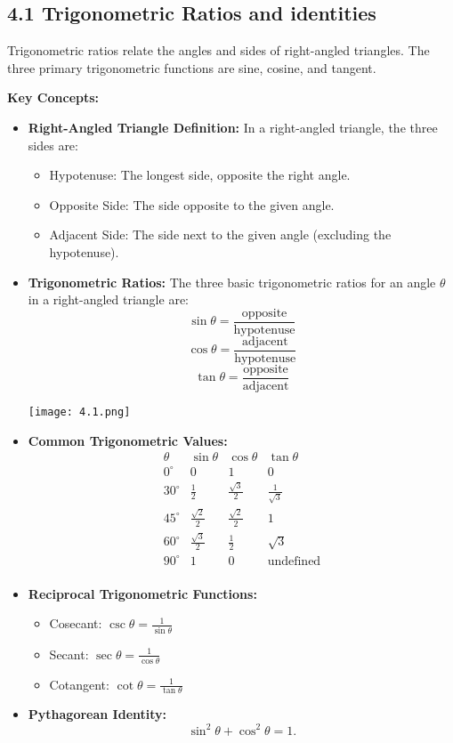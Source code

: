 
\subsection*{4.1 Trigonometric Ratios and identities}
Trigonometric ratios relate the angles and sides of right-angled triangles. The three primary trigonometric functions are sine, cosine, and tangent.

\textbf{Key Concepts:}

\begin{itemize}
	\item \textbf{Right-Angled Triangle Definition:}
	In a right-angled triangle, the three sides are:
	\begin{itemize}
		\item Hypotenuse: The longest side, opposite the right angle.
		\item Opposite Side: The side opposite to the given angle.
		\item Adjacent Side: The side next to the given angle (excluding the hypotenuse).
	\end{itemize}
	
	\item \textbf{Trigonometric Ratios:}
	The three basic trigonometric ratios for an angle $\theta$ in a right-angled triangle are:
	\[
	\sin \theta = \frac{\text{opposite}}{\text{hypotenuse}}
	\]
	\[
	\cos \theta = \frac{\text{adjacent}}{\text{hypotenuse}}
	\]
	\[
	\tan \theta = \frac{\text{opposite}}{\text{adjacent}}
	\]
	
	
	\begin{center}
		\texttt{[image: 4.1.png]}
	\end{center}
	
	\newpage
	\item \textbf{Common Trigonometric Values:}
	\[
	\begin{array}{c|c|c|c}
		\theta & \sin \theta & \cos \theta & \tan \theta \\
		\hline
		0^\circ & 0 & 1 & 0 \\
		30^\circ & \frac{1}{2} & \frac{\sqrt{3}}{2} & \frac{1}{\sqrt{3}} \\
		45^\circ & \frac{\sqrt{2}}{2} & \frac{\sqrt{2}}{2} & 1 \\
		60^\circ & \frac{\sqrt{3}}{2} & \frac{1}{2} & \sqrt{3} \\
		90^\circ & 1 & 0 & \text{undefined} \\
	\end{array}
	\]
	
	\item \textbf{Reciprocal Trigonometric Functions:}
	\begin{itemize}
		\item Cosecant: $\csc \theta = \frac{1}{\sin \theta}$
		\item Secant: $\sec \theta = \frac{1}{\cos \theta}$
		\item Cotangent: $\cot \theta = \frac{1}{\tan \theta}$
	\end{itemize}
	
	\item \textbf{Pythagorean Identity:}
	\[
	\sin^2 \theta + \cos^2 \theta = 1.
	\]
\end{itemize}

